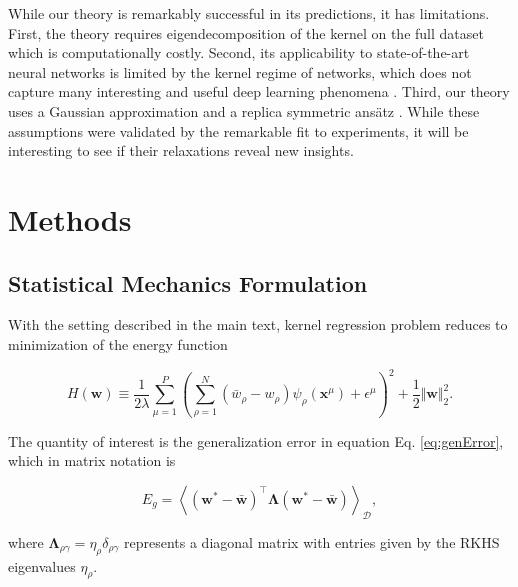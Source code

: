 \documentclass[11pt]{article}
\def\bLambda{{\bm \Lambda}}
\def\bLambda{{\bf{H}}}
\def\bLambda{{\bm \Lambda}}
\def\w{{\mathbf w}}
\def\x{{\mathbf x}}
\begin{document}
While our theory is remarkably successful in its predictions, it has limitations. First, the theory requires eigendecomposition of the kernel on the full dataset which is computationally costly. 
Second, its applicability to state-of-the-art neural networks is limited by the kernel regime of networks, which does not capture many interesting and useful deep learning phenomena \cite{fort2020deep,chizat2020implicit}.  Third, our theory uses a Gaussian approximation \cite{Dietrich_Sompolinsky} and a replica symmetric ans\"atz \cite{mezard1987spin}. While these assumptions were validated by the remarkable fit to experiments, it will be interesting to see if their relaxations reveal new insights.




\section*{Methods}\label{Methods}

\subsection*{Statistical Mechanics Formulation}

With the setting described in the main text, kernel regression problem reduces to minimization of the energy function
\begin{linenomath*}\begin{equation}\label{eq:energy_fn}
     H(\w) \equiv \frac{1}{2\lambda} \sum_{\mu=1}^P\left(\sum_{\rho=1}^N(\bar w_{\rho}-w_{\rho})\psi_{\rho}(\x^\mu)+\epsilon^\mu\right)^2 + \frac{1}{2}\Vert\w\Vert^2_2.
\end{equation}\end{linenomath*}
%
The quantity of interest is the generalization error in equation Eq. \eqref{eq:genError}, which in matrix notation is
\begin{linenomath*}\begin{equation}
    E_g =  \left<(\w^*-\bar\w)^\top\bLambda(\w^*-\bar\w)\right>_{\mathcal{D}},
\end{equation}\end{linenomath*}
where $\bLambda_{\rho\gamma} = \eta_\rho\delta_{\rho\gamma}$ represents a diagonal matrix with entries given by the RKHS eigenvalues $\eta_\rho$.
\end{document}
